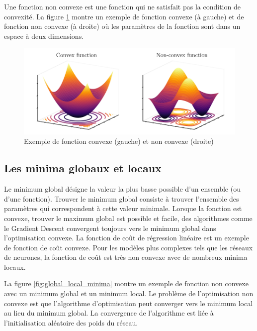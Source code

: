 Une fonction non convexe est une fonction qui ne satisfait pas la condition de convexité. La figure \ref{fig:convex-nonconvex-functions} montre un exemple de fonction convexe (à gauche) et de fonction non convexe (à droite) où les paramètres de la fonction sont dans un espace à deux dimensions.

\begin{figure}[h]
    \centering
    \includegraphics{figures/gradient_descent.pdf}
    \caption{Exemple de fonction convexe (gauche) et non convexe (droite)}
    \label{fig:convex-nonconvex-functions}
\end{figure}


\subsection{Les minima globaux et locaux}
Le minimum global désigne la valeur la plus basse possible d'un ensemble (ou d'une fonction). Trouver le minimum global consiste à trouver l'ensemble des paramètres qui correspondent à cette valeur minimale. Lorsque la fonction est convexe, trouver le maximum global est possible et facile, des algorithmes comme le Gradient Descent convergent toujours vers le minimum global dans l'optimisation convexe. La fonction de coût de régression linéaire est un exemple de fonction de coût convexe. Pour les modèles plus complexes tels que les réseaux de neurones, la fonction de coût est très non convexe avec de nombreux minima locaux.

La figure \ref{fig:global_local_minima} montre un exemple de fonction non convexe avec un minimum global et un minimum local. Le problème de l'optimisation non convexe est que l'algorithme d'optimisation peut converger vers le minimum local au lieu du minimum global. La convergence de l'algorithme est liée à l'initialisation aléatoire des poids du réseau.

